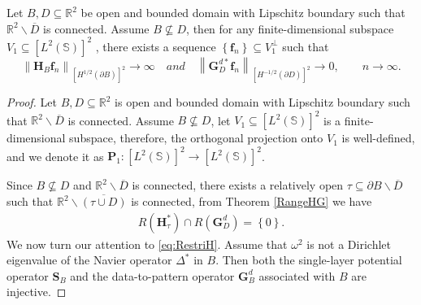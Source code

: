\documentclass[10pt,a4paper]{amsart}
\begin{document}
\begin{thm}\label{LocialWaveFounc}
 Let $B, D  \subseteq \mathbb R^2$ be open and bounded domain with  Lipschitz boundary such that $\mathbb R^2 \backslash \overline {D}$ is connected. Assume $B \nsubseteq D$, then for any finite-dimensional subspace $V_1 \subseteq \left[L^{2}\left(\mathbb S\right) \right] ^2 $ , there exists a sequence $\left\lbrace  \mathbf f_n \right\rbrace  \subseteq  V_1^{\perp} $ such that
 $$
 \left\|\mathbf H_B \mathbf f_n\right\|_{\left[H^{1/2}\left(\partial B\right) \right] ^2 } \to \infty \quad and \quad \left\| \mathbf G_D^{d*} \mathbf f_n\right\|_{\left[H^{-1/2}\left(\partial D\right) \right] ^2 } \to 0, \qquad n\to \infty.
 $$
\end{thm}

\begin{proof}
Let $B, D  \subseteq \mathbb R^2$ is open and bounded domain with Lipschitz boundary such that $\mathbb R^2 \backslash \overline {D}$ is connected. Assume $B \nsubseteq D$, let $V_1 \subseteq \left[L^{2}\left(\mathbb S\right) \right] ^2 $ is a finite-dimensional subspace, therefore, the orthogonal projection onto $V_1$ is well-defined, and we denote it as $\mathbf P_1 :\left[L^{2}\left(\mathbb S\right) \right] ^2 \to \left[L^{2}\left(\mathbb S\right) \right] ^2$. 

Since $B \nsubseteq D $ and $\mathbb R^2 \backslash \overline {D}$ is connected, there exists a relatively open $\tau \subseteq \partial B\backslash \overline{D}$ such that $\mathbb R^2 \backslash \overline {\left( \tau \cup D\right) }$ is connected, from Theorem \ref{RangeHG} we have
\begin{align}\label{eq:RangeHtG}
R\left( \mathbf H^*_{\tau} \right) \cap R\left( \mathbf G_D^d\right) =\left\lbrace 0\right\rbrace .
\end{align}
We now turn our attention to \eqref{eq:RestriH}. Assume that $\omega^2$ is not a Dirichlet eigenvalue of the Navier operator $\Delta^*$ in $B$. Then both the single-layer potential operator $\mathbf{S}_B$ and the data-to-pattern operator $\mathbf{G}_B^d$ associated with $B$ are injective.


\end{proof}
\end{document}
